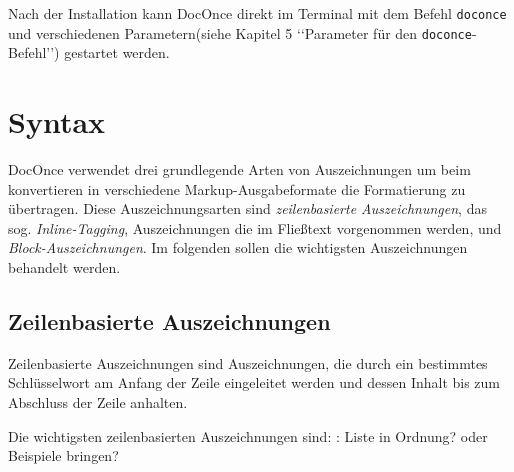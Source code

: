 \documentclass[%
oneside,                 %
final,                   %
chapterprefix=true,      %
open=right,              %
10pt]{book}
\newcommand{\shortinlinecomment}[3]{{\color{red}{\bf #1}: #2}}
\begin{document}
Nach der Installation kann DocOnce direkt im Terminal mit dem Befehl \texttt{doconce} und verschiedenen Parametern(siehe Kapitel 5 ‘‘Parameter für den \texttt{doconce}-Befehl’’) gestartet werden.
\chapter{Syntax}
DocOnce verwendet drei grundlegende Arten von Auszeichnungen um beim konvertieren in verschiedene Markup-Ausgabeformate die Formatierung zu übertragen. Diese Auszeichnungsarten sind  \emph{zeilenbasierte Auszeichnungen}, das sog. \emph{Inline-Tagging}, Auszeichnungen die im Fließtext vorgenommen werden, und \emph{Block-Auszeichnungen}. Im folgenden sollen die wichtigsten Auszeichnungen behandelt werden.

\section{Zeilenbasierte Auszeichnungen}
Zeilenbasierte Auszeichnungen sind Auszeichnungen, die durch ein bestimmtes Schlüsselwort am Anfang der Zeile eingeleitet werden und dessen Inhalt bis zum Abschluss der Zeile anhalten.

Die wichtigsten zeilenbasierten Auszeichnungen sind:
\shortinlinecomment{Simon 1}{ Liste in Ordnung? oder Beispiele bringen? }{ Liste in Ordnung? oder }
\end{document}

